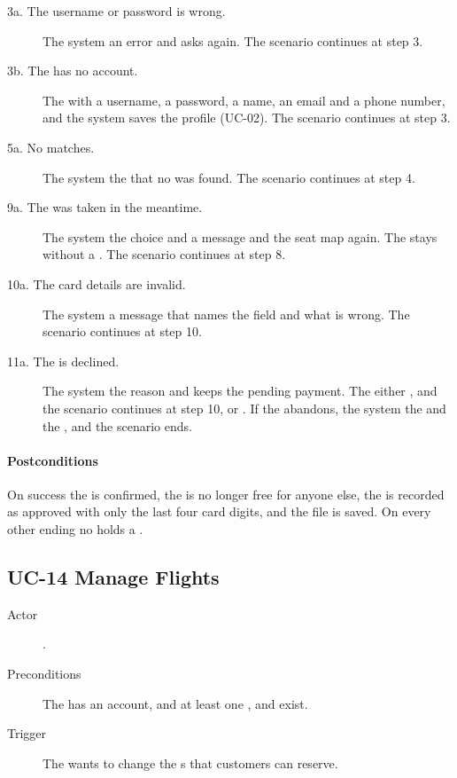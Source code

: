 \begin{description}
\item[3a. The username or password is wrong.] The system  an error and
  asks again. The scenario continues at step 3.
\item[3b. The  has no account.] The 
   with a username, a password, a name, an email and a phone
  number, and the system saves the profile (UC-02). The scenario continues at
  step 3.
\item[5a. No  matches.] The system  the 
  that no  was found. The scenario continues at step 4.
\item[9a. The  was taken in the meantime.] The system 
  the choice and  a message and the seat map again. The
   stays without a . The scenario continues at
  step 8.
\item[10a. The card details are invalid.] The system  a message that
  names the field and what is wrong. The scenario continues at step 10.
\item[11a. The  is declined.] The system  the reason and
  keeps the  pending payment. The  either
  , and the scenario continues at step 10, or . If the
   abandons, the system  the  and
   the , and the scenario ends.
\end{description}

\paragraph{Postconditions}

On success the  is confirmed, the  is no longer free
for anyone else, the  is recorded as approved with only the last
four card digits, and the  file is saved. On every other
ending no  holds a .

\subsection*{UC-14 Manage Flights}

\begin{description}
\item[Actor] .
\item[Preconditions] The  has an account, and at least one
  ,  and  exist.
\item[Trigger] The  wants to change the s that
  customers can reserve.
\end{description}

